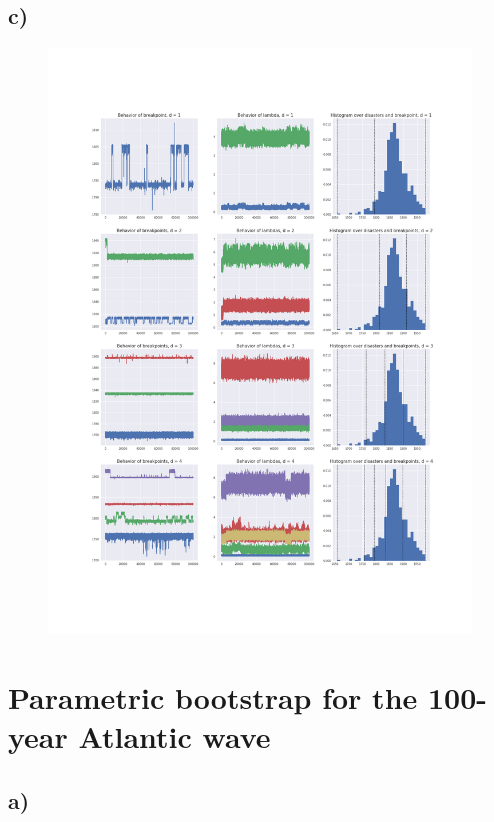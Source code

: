 \documentclass[a4paper]{article}
\begin{document}
\subsection*{c)}

\begin{figure}[H]
    \centering
    \includegraphics[width = 1.0\textwidth]{images/chain_behavior.png} 
    \caption{}
    \label{}
\end{figure}

\newpage

\section{Parametric bootstrap for the 100-year Atlantic wave}

\subsection*{a)}
\end{document}
